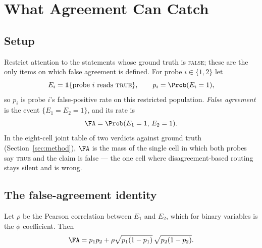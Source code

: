 %
%
\section{What Agreement Can Catch}
\label{sec:theory}

\subsection{Setup}
\label{sec:theory:setup}

Restrict attention to the statements whose ground truth is \textsc{false}; these
are the only items on which false agreement is defined. For probe $i \in \{1,2\}$
let
\[
  E_i = \mathbf{1}\{\text{probe $i$ reads \textsc{true}}\},
  \qquad
  p_i = \Prob(E_i = 1),
\]
so $p_i$ is probe $i$'s false-positive rate on this restricted population.
\emph{False agreement} is the event $\{E_1 = E_2 = 1\}$, and its rate is
\[
  \FA = \Prob(E_1 = 1,\, E_2 = 1).
\]
In the eight-cell joint table of two verdicts against ground truth
(Section~\ref{sec:method}), $\FA$ is the mass of the single cell in which both
probes say \textsc{true} and the claim is false --- the one cell where
disagreement-based routing stays silent and is wrong.

\subsection{The false-agreement identity}
\label{sec:theory:identity}

\begin{proposition}
\label{prop:identity}
Let $\rho$ be the Pearson correlation between $E_1$ and $E_2$, which for binary
variables is the $\phi$ coefficient. Then
\begin{equation}
  \FA = p_1 p_2 + \rho \sqrt{p_1(1-p_1)}\,\sqrt{p_2(1-p_2)}.
  \label{eq:identity}
\end{equation}
\end{proposition}

